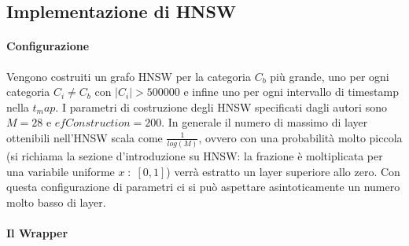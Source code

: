 
\subsection{Implementazione di HNSW}

\paragraph{Configurazione}

Vengono costruiti un grafo HNSW per la categoria $C_b$ pi\`u grande, uno per ogni categoria $C_i \ne C_b$ con $|C_i| > 500000$ e infine uno per ogni intervallo di timestamp nella $t_map$.
I parametri di costruzione degli HNSW specificati dagli autori sono $M = 28$ e $efConstruction = 200$.
In generale il numero di massimo di layer ottenibili nell'HNSW scala come $\frac 1 {log(M)}$, ovvero con una probabilit\`a molto piccola (si richiama la sezione d'introduzione su HNSW: la frazione \`e moltiplicata per una variabile uniforme $x \; : \; [0,1]$) verr\`a estratto un layer superiore allo zero. Con questa configurazione di parametri ci si pu\`o aspettare asintoticamente un numero molto basso di layer.

\paragraph{Il Wrapper}

